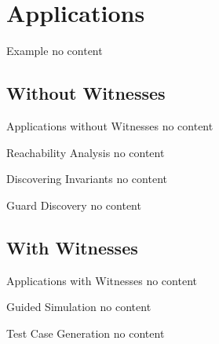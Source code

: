 \section{Applications}

\begin{frame}{Example}
  no content
\end{frame}

\subsection{Without Witnesses}

\begin{frame}{Applications without Witnesses}
  no content
\end{frame}

\begin{frame}{Reachability Analysis}
  no content
\end{frame}

\begin{frame}{Discovering Invariants}
  no content
\end{frame}

\begin{frame}{Guard Discovery}
  no content
\end{frame}

\subsection{With Witnesses} 

\begin{frame}{Applications with Witnesses}
  no content
\end{frame}

\begin{frame}{Guided Simulation}
  no content
\end{frame}

\begin{frame}{Test Case Generation}
  no content
\end{frame}
